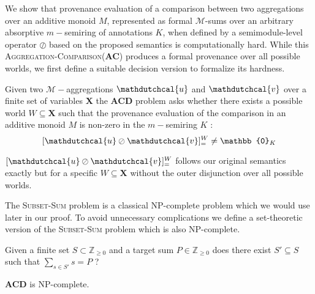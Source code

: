 We show that provenance evaluation of a comparison between 
two aggregations over an additive monoid $M$, 
represented as formal $\mathcal{M}$-sums over an arbitrary 
absorptive $m-$semiring of annotations $K$, when defined by a
semimodule-level operator
$\oslash$ based on the proposed semantics is computationally hard.
While this \textsc{Aggregation-Comparison}(\textbf{AC}) produces 
a formal provenance over all possible worlds, we first define a 
suitable decision version to formalize its hardness. 
\begin{definition}
  Given two $\mathcal{M}-$aggregations $\mathdutchcal{u}$ and $\mathdutchcal{v}$ over a 
  finite set of variables $\mathbf{X}$
  the \textbf{ACD} problem asks whether there exists a possible world $W\subseteq\mathbf{X}$ such 
  that the provenance evaluation of the comparison in an additive monoid $M$ is non-zero in 
  the $m-$semiring $K$ :
\[
  [\mathdutchcal{u} \oslash \mathdutchcal{v}]_=^W\neq\mathbb{0}_{K}
  \]
\end{definition}
\begin{remark}
  $  [\mathdutchcal{u} \oslash \mathdutchcal{v}]_=^W$ follows our original semantics exactly but for a specific $W\subseteq\mathbf{X}$ without the outer disjunction over all possible worlds.
\end{remark}
The \textsc{Subset-Sum} problem is a classical NP-complete problem which we would use later in our proof. To avoid unnecessary complications we define a set-theoretic version of the \textsc{Subset-Sum} problem which is also NP-complete. 
\begin{definition}
  Given a finite set $S\subset\mathbb{Z}_{\geq 0}$ and a target sum $P\in\mathbb{Z}_{\geq 0}$ does 
  there exist $S'\subseteq S$ such that $\sum_{s\in S'}s=P$ ?
\end{definition}
\begin{theorem}\label{th:ACD_NP}
  \textbf{ACD} is NP-complete.
\end{theorem}
